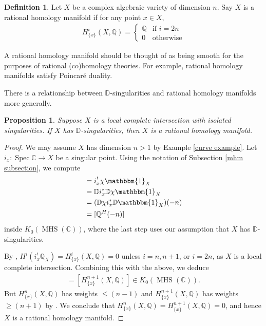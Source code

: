 \documentclass{amsart}
\newtheorem{prop}[thm]{Proposition}
\theoremstyle{definition}
\newtheorem{defn}[thm]{Definition}
\DeclareMathOperator{\MHS}{MHS}
\numberwithin{equation}{section}
\begin{document}
\begin{defn}\label{rhm defn}
Let $X$ be a complex algebraic variety of dimension $n$. Say $X$ is a rational homology manifold if for any point $x \in X$,
\begin{align*}
    H^i_{\{x\}}(X, \mathbb{Q}) =  
    \begin{cases}
                \mathbb{Q} & \text{if } i = 2n \\
                0 & \text{otherwise}
            \end{cases}
\end{align*}
\end{defn}
A rational homology manifold should be thought of as being smooth for the purposes of rational (co)homology theories. For example, rational homology manifolds satisfy Poincaré duality.

There is a relationship between $\mathbb{D}$-singularities and rational homology manifolds more generally.

\begin{prop}\label{D-sing implies rhm}
Suppose $X$ is a local complete intersection with isolated singularities. If $X$ has $\mathbb{D}$-singularities, then $X$ is a rational homology manifold.
\end{prop}

\begin{proof}
We may assume $X$ has dimension $n > 1$ by Example \ref{curve example}. Let $i_x: \mathop{\mathrm{Spec}}\mathbb{C} \rightarrow X$ be a singular point. Using the notation of Subsection \ref{mhm subsection}, we compute
\begin{align*}
    [i_x^! \mathbb{Q}_X^H] &= i_x^! \chi \mathbbm{1}_X  \\
                        &= \mathbb{D} i_x^* \mathbb{D} \chi \mathbbm{1}_X \\
                        &= (\mathbb{D} \chi i_x^* \mathbb{D} \mathbbm{1}_X)(-n) \\
                        &= [\mathbb{Q}^H(-n)]
\end{align*}
inside $K_0(\MHS(\mathbb{C}))$, where the last step uses our assumption that $X$ has $\mathbb{D}$-singularities.

By \cite{hamm}, $H^i(i_x^! \mathbb{Q}_X) = H^i_{\{x\}}(X, \mathbb{Q}) = 0$ unless $i = n, n+1$, or $i = 2n$, as $X$ is a local complete intersection. Combining this with the above, we deduce
\begin{align*}
    [H^{n}_{\{x\}}(X, \mathbb{Q})] = [H^{n+1}_{\{x\}}(X, \mathbb{Q})] \in K_0(\MHS(\mathbb{C})).
\end{align*}
But $H^{n}_{\{x\}}(X, \mathbb{Q})$ has weights $\leq (n-1)$ and $H^{n+1}_{\{x\}}(X, \mathbb{Q})$ has weights $\geq (n+1)$ by \cite{link}. We conclude that $H^{n}_{\{x\}}(X, \mathbb{Q}) = H^{n+1}_{\{x\}}(X, \mathbb{Q}) = 0$, and hence $X$ is a rational homology manifold.
\end{proof}
\end{document}
